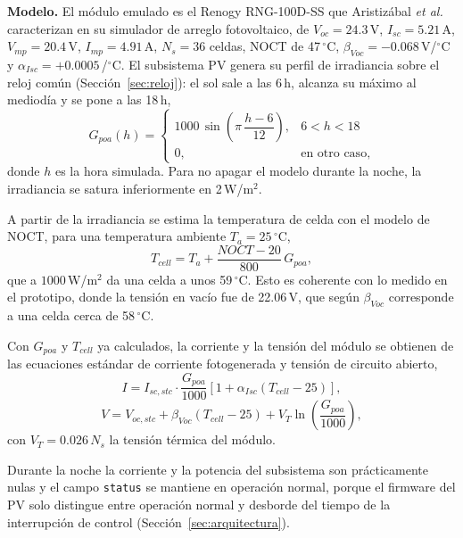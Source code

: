 \documentclass[conference]{IEEEtran}
\begin{document}
\textbf{Modelo.} El módulo emulado es el Renogy RNG-100D-SS que Aristizábal \emph{et al.}~\cite{aristizabal2026pv} caracterizan en su simulador de arreglo fotovoltaico, de $V_{oc}=24.3$\,V, $I_{sc}=5.21$\,A, $V_{mp}=20.4$\,V, $I_{mp}=4.91$\,A, $N_s=36$ celdas, NOCT de 47\,$^{\circ}$C, $\beta_{Voc}=-0.068$\,V/$^{\circ}$C y $\alpha_{Isc}=+0.0005$\,/$^{\circ}$C. El subsistema PV genera su perfil de irradiancia sobre el reloj común (Sección~\ref{sec:reloj}): el sol sale a las 6\,h, alcanza su máximo al mediodía y se pone a las 18\,h,
\begin{equation}
\label{eq:pv_G}
G_{poa}(h) = \begin{cases}
1000\,\sin\!\left(\pi\,\dfrac{h-6}{12}\right), & 6 < h < 18 \\[6pt]
0, & \text{en otro caso,}
\end{cases}
\end{equation}
donde $h$ es la hora simulada. Para no apagar el modelo durante la noche, la irradiancia se satura inferiormente en 2\,W/m$^2$.

A partir de la irradiancia se estima la temperatura de celda con el modelo de NOCT, para una temperatura ambiente $T_a=25\,^{\circ}$C,
\begin{equation}
\label{eq:pv_Tcell}
T_{cell} = T_a + \frac{NOCT-20}{800}\,G_{poa},
\end{equation}
que a $1000$\,W/m$^2$ da una celda a unos 59\,$^{\circ}$C. Esto es coherente con lo medido en el prototipo, donde la tensión en vacío fue de 22.06\,V, que según $\beta_{Voc}$ corresponde a una celda cerca de 58\,$^{\circ}$C.

Con $G_{poa}$ y $T_{cell}$ ya calculados, la corriente y la tensión del módulo se obtienen de las ecuaciones estándar de corriente fotogenerada y tensión de circuito abierto,
\begin{equation}
\label{eq:pv_I}
I = I_{sc,stc}\cdot\frac{G_{poa}}{1000}\left[1+\alpha_{Isc}(T_{cell}-25)\right],
\end{equation}
\begin{equation}
\label{eq:pv_V}
V = V_{oc,stc} + \beta_{Voc}(T_{cell}-25) + V_T \ln\!\left(\frac{G_{poa}}{1000}\right),
\end{equation}
con $V_T=0.026\,N_s$ la tensión térmica del módulo.

Durante la noche la corriente y la potencia del subsistema son prácticamente nulas y el campo \texttt{status} se mantiene en operación normal, porque el firmware del PV solo distingue entre operación normal y desborde del tiempo de la interrupción de control (Sección~\ref{sec:arquitectura}).
\end{document}
